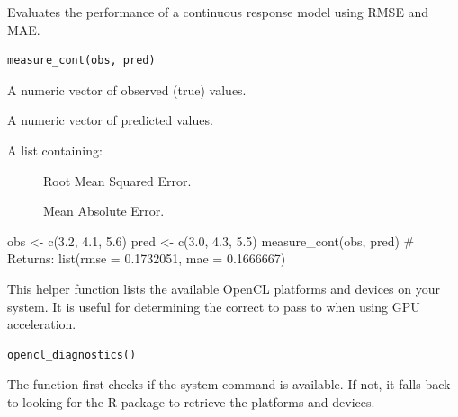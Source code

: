 \documentclass[a4paper]{book}
\begin{document}
%
\begin{Description}
Evaluates the performance of a continuous response model using RMSE and MAE.
\end{Description}
%
\begin{Usage}
\begin{verbatim}
measure_cont(obs, pred)
\end{verbatim}
\end{Usage}
%
\begin{Arguments}
\begin{ldescription}
\item[\code{obs}] A numeric vector of observed (true) values.

\item[\code{pred}] A numeric vector of predicted values.
\end{ldescription}
\end{Arguments}
%
\begin{Value}
A list containing:
\begin{description}

\item[] Root Mean Squared Error.
\item[] Mean Absolute Error.

\end{description}

\end{Value}
%
\begin{Examples}
\begin{ExampleCode}
obs <- c(3.2, 4.1, 5.6)
pred <- c(3.0, 4.3, 5.5)
measure_cont(obs, pred)
# Returns: list(rmse = 0.1732051, mae = 0.1666667)

\end{ExampleCode}
\end{Examples}
%
\begin{Description}
This helper function lists the available OpenCL platforms and devices
on your system. It is useful for determining the correct 
to pass to  when using GPU acceleration.
\end{Description}
%
\begin{Usage}
\begin{verbatim}
opencl_diagnostics()
\end{verbatim}
\end{Usage}
%
\begin{Details}
The function first checks if the  system command is available.
If not, it falls back to looking for the  R package to retrieve the
platforms and devices.
\end{Details}
\end{document}

